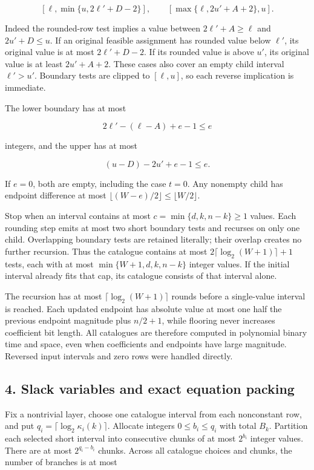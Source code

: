 \[
[\ell,\min\{u,2\ell'+D-2\}],\qquad
[\max\{\ell,2u'+A+2\},u].
\]

Indeed the rounded-row test implies a value between \(2\ell'+A\ge\ell\) and \(2u'+D\le u\). If an original feasible assignment has rounded value below \(\ell'\), its original value is at most \(2\ell'+D-2\). If its rounded value is above \(u'\), its original value is at least \(2u'+A+2\). These cases also cover an empty child interval \(\ell'>u'\). Boundary tests are clipped to \([\ell,u]\), so each reverse implication is immediate.

The lower boundary has at most

\[
2\ell'-(\ell-A)+e-1\le e
\]

integers, and the upper has at most

\[
(u-D)-2u'+e-1\le e.
\]

If \(e=0\), both are empty, including the case \(t=0\). Any nonempty child has endpoint difference at most \(\lfloor(W-e)/2\rfloor\le\lfloor W/2\rfloor\).

Stop when an interval contains at most \(c=\min\{d,k,n-k\}\ge1\) values. Each rounding step emits at most two short boundary tests and recurses on only one child. Overlapping boundary tests are retained literally; their overlap creates no further recursion. Thus the catalogue contains at most \(2\lceil\log_2(W+1)\rceil+1\) tests, each with at most \(\min\{W+1,d,k,n-k\}\) integer values. If the initial interval already fits that cap, its catalogue consists of that interval alone.

The recursion has at most \(\lceil\log_2(W+1)\rceil\) rounds before a single-value interval is reached. Each updated endpoint has absolute value at most one half the previous endpoint magnitude plus \(n/2+1\), while flooring never increases coefficient bit length. All catalogues are therefore computed in polynomial binary time and space, even when coefficients and endpoints have large magnitude. Reversed input intervals and zero rows were handled directly.

\hypertarget{af-2bf1c1784c-slack-variables-and-exact-equation-packing}{%
\subsection{4. Slack variables and exact equation packing}\label{af-2bf1c1784c-slack-variables-and-exact-equation-packing}}

Fix a nontrivial layer, choose one catalogue interval from each nonconstant row, and put \(q_i=\lceil\log_2\kappa_i(k)\rceil\). Allocate integers \(0\le b_i\le q_i\) with total \(B_k\). Partition each selected short interval into consecutive chunks of at most \(2^{b_i}\) integer values. There are at most \(2^{q_i-b_i}\) chunks. Across all catalogue choices and chunks, the number of branches is at most

